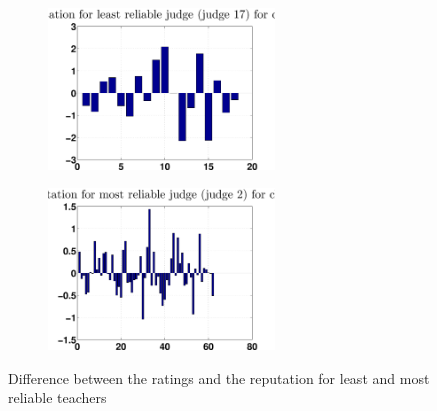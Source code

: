 \documentclass[12pt,a4paper]{article}
\begin{document}
\begin{figure}[!h]
\centering
\begin{subfigure}[b]{0.48\textwidth}
\includegraphics[width = 6cm]{preprocessSelect/ppsdiffRaReLeastK6000c2.eps}
\end{subfigure}
\begin{subfigure}[b]{0.48\textwidth}
\includegraphics[width = 6cm]{preprocessSelect/ppsdiffRaReMostK6000c1.eps}
\end{subfigure}
\caption{\label{diffLM}Difference between the ratings and the reputation for least and most reliable teachers}
\end{figure}

\FloatBarrier
\end{document}
